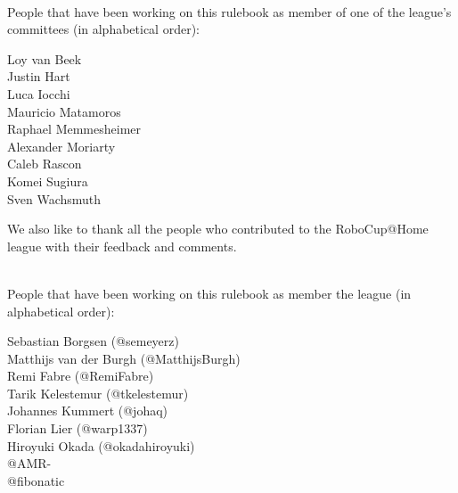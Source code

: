 ~\\\noindent People that have been working on this rulebook as member of one of the league's committees (in alphabetical order):
\begin{center}
\begin{minipage}{0.8\textwidth}
\begin{multicols}{3}%
\footnotesize
\noindent%
Loy van Beek\\
Justin Hart\\
Luca Iocchi\\
\columnbreak
Mauricio Matamoros\\
Raphael Memmesheimer\\
Alexander Moriarty\\
\columnbreak
Caleb Rascon\\
Komei Sugiura\\
Sven Wachsmuth\\
\end{multicols}
\end{minipage}
\end{center}

We also like to thank all the people who contributed to the RoboCup@Home league with their feedback and comments.

~\\\noindent People that have been working on this rulebook as member the league (in alphabetical order):
\begin{center}
\begin{minipage}{0.8\textwidth}
\begin{multicols}{2}%
\footnotesize
\noindent%
Sebastian Borgsen (@semeyerz)\\
Matthijs van der Burgh (@MatthijsBurgh)\\
Remi Fabre (@RemiFabre)\\
Tarik Kelestemur (@tkelestemur)\\
\columnbreak%
Johannes Kummert (@johaq)\\
Florian Lier (@warp1337)\\
Hiroyuki Okada (@okadahiroyuki)\\
@AMR-\\
@fibonatic\\
\end{multicols}
\end{minipage}
\end{center}


